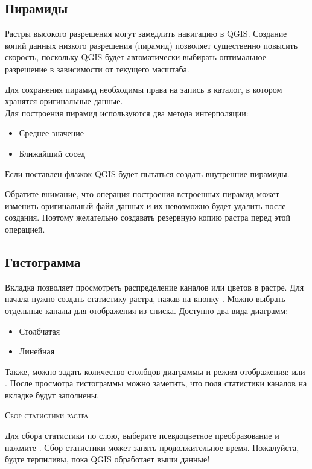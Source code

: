 \subsection{Пирамиды}\label{raster_pyramids}

Растры высокого разрешения могут замедлить навигацию в QGIS. Создание
копий данных низкого разрешения (пирамид) позволяет существенно повысить
скорость, поскольку QGIS будет автоматически выбирать оптимальное
разрешение в зависимости от текущего масштаба.

Для сохранения пирамид необходимы права на запись в каталог, в котором
хранятся оригинальные данные. \\
Для построения пирамид используются два метода интерполяции:
\begin{itemize}[label=--]
\item Среднее значение
\item Ближайший сосед
\end{itemize}

Если поставлен флажок
 QGIS будет
пытаться создать внутренние пирамиды.

Обратите внимание, что операция построения встроенных пирамид может
изменить оригинальный файл данных и их невозможно будет удалить после
создания. Поэтому желательно создавать резервную копию растра перед этой
операцией.

\subsection{Гистограмма}\label{label_histogram}

Вкладка  позволяет просмотреть распределение 
каналов или цветов в растре. Для начала нужно создать статистику растра,
нажав на кнопку . Можно выбрать отдельные каналы для
отображения из списка. Доступно два вида диаграмм:

\begin{itemize}[label=--]
\item Столбчатая
\item Линейная
\end{itemize}

Также, можно задать количество столбцов диаграммы и режим отображения:
 или .
После просмотра гистограммы можно заметить, что поля статистики каналов
на вкладке  будут заполнены.

\begin{Tip}\caption{\textsc{Сбор статистики растра}}
Для сбора статистики по слою, выберите псевдоцветное преобразование и
нажмите . Сбор статистики может занять продолжительное
время. Пожалуйста, будте терпиливы, пока QGIS обработает выши данные!
\end{Tip}

\FloatBarrier

